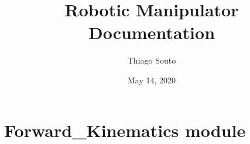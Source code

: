 \documentclass[letterpaper,10pt,english,openany,oneside]{sphinxmanual}
\title{Robotic Manipulator Documentation}
\date{May 14, 2020}
\author{Thiago Souto}
\begin{document}
\maketitle
\sphinxtableofcontents
{}\label{\detokenize{index::doc}}



\chapter{Forward\_Kinematics module}
\label{\detokenize{Forward_Kinematics:module-Forward_Kinematics}}\label{\detokenize{Forward_Kinematics:welcome-to-matrices-manipulation-s-documentation}}\label{\detokenize{Forward_Kinematics::doc}}\label{\detokenize{Forward_Kinematics:forward-kinematics-module}}
\end{document}
